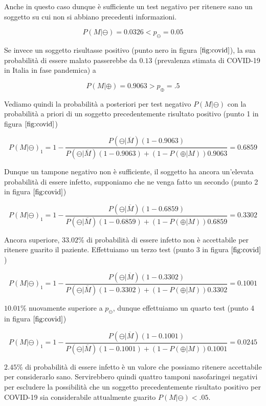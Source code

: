 \documentclass[11pt]{article}
\begin{document}
    
    Anche in questo caso dunque è sufficiente un test negativo per ritenere
sano un soggetto su cui non si abbiano precedenti informazioni.

    \[
P(M|\ominus) = 0.0326 < p_{\ominus} = 0.05
\]

    
    Se invece un soggetto risultasse positivo (punto nero in figura
\(\ref{fig:covid}\)), la sua probabilità di essere malato passerebbe da
\(0.13\) (prevalenza stimata di COVID-19 in Italia in fase pandemica) a

    \[
P(M|\oplus) = 0.9063 > p_{\oplus} = .5
\]

    
    Vediamo quindi la probabilità a posteriori per test negativo
\(P(M|\ominus)\) con la probabilità a priori di un soggetto
precedentemente risultato positivo (punto 1 in figura
\(\ref{fig:covid}\))

    \[
P(M|\ominus)_1 = 1 - \frac{
P(\ominus|\overline{M})(1 - 0.9063)
}{
P(\ominus|\overline{M})(1 - 0.9063) + (1 - P(\oplus|M))0.9063
} = 0.6859
\]

    
    Dunque un tampone negativo non è sufficiente, il soggetto ha ancora
un'elevata probabilità di essere infetto, supponiamo che ne venga fatto
un secondo (punto 2 in figura \(\ref{fig:covid}\))

    \[
P(M|\ominus)_1 = 1 - \frac{
P(\ominus|\overline{M})(1 - 0.6859)
}{
P(\ominus|\overline{M})(1 - 0.6859) + (1 - P(\oplus|M))0.6859
} = 0.3302
\]

Ancora superiore, \(33.02%
\)\% di probabilità di essere infetto non è accettabile per ritenere
guarito il paziente. Effettuiamo un terzo test (punto 3 in figura
\(\ref{fig:covid}\))

    
    \[
P(M|\ominus)_1 = 1 - \frac{
P(\ominus|\overline{M})(1 - 0.3302)
}{
P(\ominus|\overline{M})(1 - 0.3302) + (1 - P(\oplus|M))0.3302
} = 0.1001
\]

\(10.01%
\)\% nuovamente superiore a \(p_{\ominus}\), dunque effettuiamo un
quarto test (punto 4 in figura \(\ref{fig:covid}\))

    
    \[
P(M|\ominus)_1 = 1 - \frac{
P(\ominus|\overline{M})(1 - 0.1001)
}{
P(\ominus|\overline{M})(1 - 0.1001) + (1 - P(\oplus|M))0.1001
} = 0.0245
\]

\(2.45%
\)\% di probabilità di essere infetto è un valore che possiamo ritenere
accettabile per considerarlo sano. Servirebbero quindi quattro tamponi
nasofaringei negativi per escludere la possibilità che un soggetto
precedentemente risultato positivo per COVID-19 sia considerabile
attualmente guarito \(P(M|\ominus)<.05\).
\end{document}
